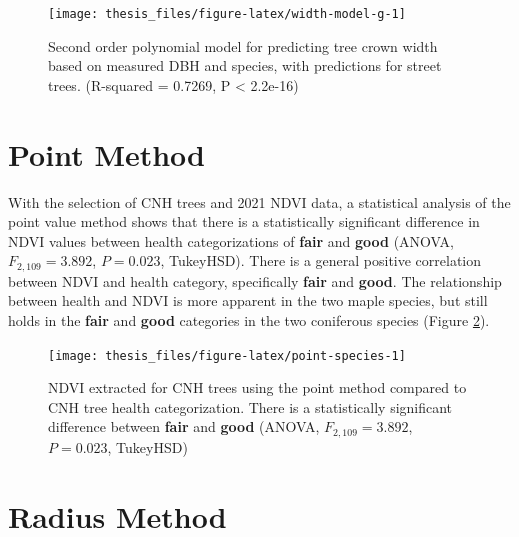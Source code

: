 \documentclass[12pt,twoside]{reedthesis}
\begin{document}
\begin{figure}

{\centering \texttt{[image: thesis\_files/figure-latex/width-model-g-1]} 

}

\caption[Crown width predictive model]{Second order polynomial model for predicting tree crown width based on measured DBH and species, with predictions for street trees. (R-squared = 0.7269,  P < 2.2e-16)}\label{fig:width-model-g}
\end{figure}
\hypertarget{point-method-1}{%
\section{Point Method}\label{point-method-1}}

With the selection of CNH trees and 2021 NDVI data, a statistical analysis of the point value method shows that there is a statistically significant difference in NDVI values between health categorizations of \textbf{fair} and \textbf{good} (ANOVA, \(F_{2, 109} = 3.892\), \(P = 0.023\), TukeyHSD). There is a general positive correlation between NDVI and health category, specifically \textbf{fair} and \textbf{good}. The relationship between health and NDVI is more apparent in the two maple species, but still holds in the \textbf{fair} and \textbf{good} categories in the two coniferous species (Figure \ref{fig:point-species}).


\begin{figure}

{\centering \texttt{[image: thesis\_files/figure-latex/point-species-1]} 

}

\caption[Point Method NDVI and Health Rating, by Species]{NDVI extracted for CNH trees using the point method compared to CNH tree health categorization. There is a statistically significant difference between \textbf{fair} and \textbf{good} (ANOVA, \(F_{2, 109} = 3.892\), \(P = 0.023\), TukeyHSD)}\label{fig:point-species}
\end{figure}
\hypertarget{radius-method-1}{%
\section{Radius Method}\label{radius-method-1}}
\end{document}
